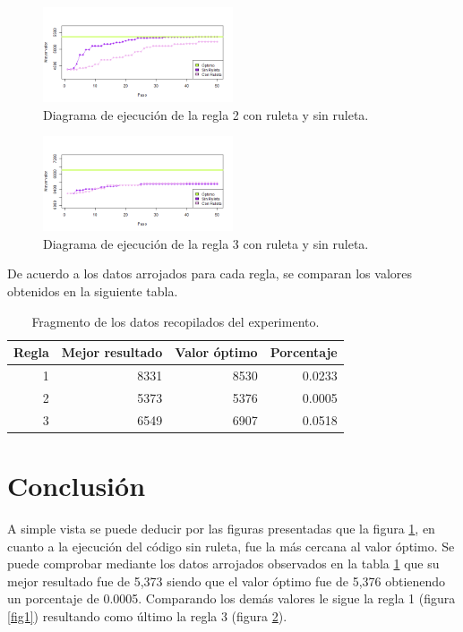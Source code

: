 \documentclass[12pt]{amsart}
\begin{document}
\begin{figure}[h!]
    \centering
    \includegraphics[width=0.5\textwidth]{t10_2.png}
    \caption{Diagrama de ejecución de la regla 2 con ruleta y sin ruleta.}
    \label{fig2}
\end{figure}

\begin{figure}[h!]
    \centering
    \includegraphics[width=0.5\textwidth]{t10_3.png}
    \caption{Diagrama de ejecución de la regla 3 con ruleta y sin ruleta.}
    \label{fig3}
\end{figure}

\clearpage
De acuerdo a los datos arrojados para cada regla, se comparan los valores obtenidos en la siguiente tabla.

\begin{table}[ht]
    \caption{Fragmento de los datos recopilados del experimento.}
    \label{datos1}
    \centering
    \begin{tabular}{|r|r|r|r|}
       \hline
        Regla&Mejor resultado&Valor óptimo&Porcentaje\\
        \hline
        1&8331 & 8530 & 0.0233 \\
        2&5373 & 5376 & 0.0005 \\
        3&6549 & 6907 & 0.0518 \\
        \hline
    \end{tabular}
\end{table}


\section{Conclusión}
A simple vista se puede deducir por las figuras presentadas que la figura \ref{fig2}, en cuanto a la ejecución del código sin ruleta, fue la más cercana al valor óptimo. Se puede comprobar mediante los datos arrojados observados en la tabla \ref{datos1} que su mejor resultado fue de 5,373 siendo que el valor óptimo fue de 5,376 obtienendo un porcentaje de 0.0005. Comparando los demás valores le sigue la regla 1 (figura \ref{fig1}) resultando como último la regla 3 (figura \ref{fig3}). 
\end{document}
